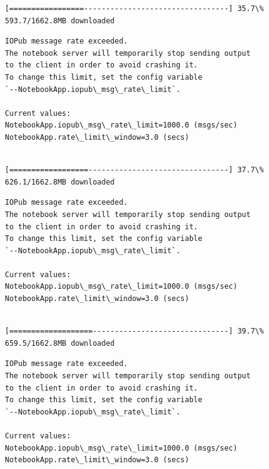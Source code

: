 \documentclass[11pt]{article}
\begin{document}
    \begin{Verbatim}[commandchars=\\\{\}]
[=================---------------------------------] 35.7\% 593.7/1662.8MB downloaded
    \end{Verbatim}

    \begin{Verbatim}[commandchars=\\\{\}]
IOPub message rate exceeded.
The notebook server will temporarily stop sending output
to the client in order to avoid crashing it.
To change this limit, set the config variable
`--NotebookApp.iopub\_msg\_rate\_limit`.

Current values:
NotebookApp.iopub\_msg\_rate\_limit=1000.0 (msgs/sec)
NotebookApp.rate\_limit\_window=3.0 (secs)


    \end{Verbatim}

    \begin{Verbatim}[commandchars=\\\{\}]
[==================--------------------------------] 37.7\% 626.1/1662.8MB downloaded
    \end{Verbatim}

    \begin{Verbatim}[commandchars=\\\{\}]
IOPub message rate exceeded.
The notebook server will temporarily stop sending output
to the client in order to avoid crashing it.
To change this limit, set the config variable
`--NotebookApp.iopub\_msg\_rate\_limit`.

Current values:
NotebookApp.iopub\_msg\_rate\_limit=1000.0 (msgs/sec)
NotebookApp.rate\_limit\_window=3.0 (secs)


    \end{Verbatim}

    \begin{Verbatim}[commandchars=\\\{\}]
[===================-------------------------------] 39.7\% 659.5/1662.8MB downloaded
    \end{Verbatim}

    \begin{Verbatim}[commandchars=\\\{\}]
IOPub message rate exceeded.
The notebook server will temporarily stop sending output
to the client in order to avoid crashing it.
To change this limit, set the config variable
`--NotebookApp.iopub\_msg\_rate\_limit`.

Current values:
NotebookApp.iopub\_msg\_rate\_limit=1000.0 (msgs/sec)
NotebookApp.rate\_limit\_window=3.0 (secs)


    \end{Verbatim}
\end{document}
